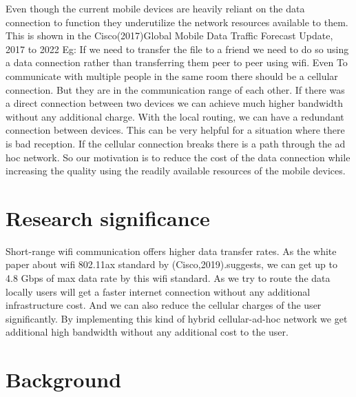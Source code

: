 	 Even though the current mobile devices are heavily reliant on the data connection to function they underutilize the network resources available to them. This is shown in the Cisco(2017)Global Mobile Data Traffic Forecast Update, 2017 to 2022\cite{mobile_web_penetration} Eg: If we need to transfer the file to a friend we need to do so using a data connection rather than transferring them peer to peer using wifi.
Even To communicate with multiple people in the same room there should be a cellular connection. But they are in the communication range of each other. If there was a direct connection between two devices we can achieve much higher bandwidth without any additional charge. With the local routing, we can have a redundant connection between devices. This can be very helpful for a situation where there is bad reception. If the cellular connection breaks there is a path through the ad hoc network.
So our motivation is to reduce the cost of the data connection while increasing the quality using the readily available resources of the mobile devices.
\vspace{12pt}

\section{Research significance}
\vspace{12pt}
Short-range wifi communication offers higher data transfer rates. As the white paper about wifi 802.11ax standard by (Cisco,2019).\cite{wifi-speed}suggests, we can get up to 4.8 Gbps of max data rate by this wifi standard. 
As we try to route the data locally users will get a faster internet connection without any additional infrastructure cost. And we can also reduce the cellular charges of the user significantly.
By implementing this kind of hybrid cellular-ad-hoc network we get additional high bandwidth without any additional cost to the user.


\vspace{12pt}


\vspace{12pt}





\pagebreak
\section{Background}
\vspace{12pt}


\vspace{12pt}


